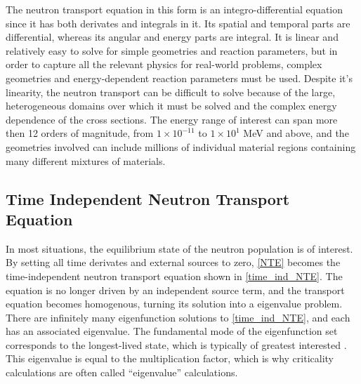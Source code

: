  The neutron transport equation in this form is an integro-differential equation since it has both derivates and integrals in it.  Its spatial and temporal parts are differential, whereas its angular and energy parts are integral.  It is linear and relatively easy to solve for simple geometries and reaction parameters, but in order to capture all the relevant physics for real-world problems, complex geometries and energy-dependent reaction parameters must be used.  Despite it's linearity, the neutron transport can be difficult to solve because of the large, heterogeneous domains over which it must be solved and the complex energy dependence of the cross sections.  
 The energy range of interest can span more then 12 orders of magnitude, from $1\times 10 ^{-11}$ to $1\times 10 ^{1}$ MeV and above, and the geometries involved can include millions of individual material regions containing many different mixtures of materials. 
 
 \subsection{Time Independent Neutron Transport Equation}

In most situations, the equilibrium state of the neutron population is of interest.  By setting all time derivates and external sources to zero, \eqref{NTE} becomes the time-independent neutron transport equation shown in \eqref{time_ind_NTE}.  The equation is no longer driven by an independent source term, and the transport equation becomes homogenous, turning its solution into a eigenvalue problem.  There are infinitely many eigenfunction solutions to \eqref{time_ind_NTE}, and each has an associated eigenvalue.  The fundamental mode of the eigenfunction set corresponds to the longest-lived state, which is typically of greatest interested \cite{duderstadt}.  This eigenvalue is equal to the multiplication factor, which is why criticality calculations are often called ``eigenvalue'' calculations. 

